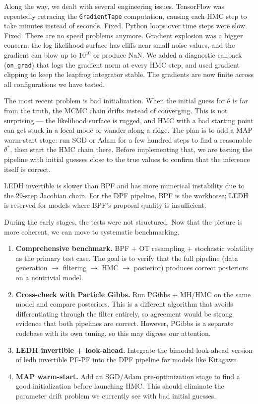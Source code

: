 \documentclass{article}
\begin{document}
Along the way, we dealt with several engineering issues. TensorFlow was repeatedly retracing the \texttt{GradientTape} computation, causing each HMC step to take minutes instead of seconds. Fixed. Python loops over time steps were slow. Fixed. There are no speed problems anymore. Gradient explosion was a bigger concern: the log-likelihood surface has cliffs near small noise values, and the gradient can blow up to $10^{10}$ or produce NaN. We added a diagnostic callback (\texttt{on\_grad}) that logs the gradient norm at every HMC step, and used gradient clipping to keep the leapfrog integrator stable. The gradients are now finite across all configurations we have tested.

The most recent problem is bad initialization. When the initial guess for $\theta$ is far from the truth, the MCMC chain drifts instead of converging. This is not surprising --- the likelihood surface is rugged, and HMC with a bad starting point can get stuck in a local mode or wander along a ridge. The plan is to add a MAP warm-start stage: run SGD or Adam for a few hundred steps to find a reasonable $\theta^*$, then start the HMC chain there. Before implementing that, we are testing the pipeline with initial guesses close to the true values to confirm that the inference itself is correct.

LEDH invertible is slower than BPF and has more numerical instability due to the 29-step Jacobian chain. For the DPF pipeline, BPF is the workhorse; LEDH is reserved for models where BPF's proposal quality is insufficient.

During the early stages, the tests were not structured. Now that the picture is more coherent, we can move to systematic benchmarking.

\begin{enumerate}
    \item \textbf{Comprehensive benchmark.} BPF + OT resampling + stochastic volatility as the primary test case. The goal is to verify that the full pipeline (data generation $\to$ filtering $\to$ HMC $\to$ posterior) produces correct posteriors on a nontrivial model.
    \item \textbf{Cross-check with Particle Gibbs.} Run PGibbs + MH/HMC on the same model and compare posteriors. This is a different algorithm that avoids differentiating through the filter entirely, so agreement would be strong evidence that both pipelines are correct. However, PGibbs is a separate codebase with its own tuning, so this may digress our attention.
    \item \textbf{LEDH invertible + look-ahead.} Integrate the bimodal look-ahead version of ledh invertible PF-PF into the DPF pipeline for models like Kitagawa.
     \item \textbf{MAP warm-start.} Add an SGD/Adam pre-optimization stage to find a good initialization before launching HMC. This should eliminate the parameter drift problem we currently see with bad initial guesses.
\end{enumerate}
\end{document}
